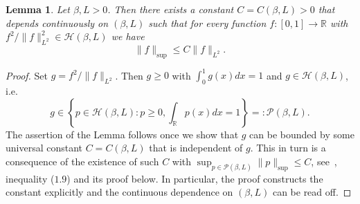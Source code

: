 \documentclass[10.5pt,letter]{article}
\numberwithin{equation}{section}
\newtheorem{lemma}[theorem]{Lemma}
\theoremstyle{definition}
\newcommand{\R}{\mathbb{R}}
\newcommand{\1}{\mathbbm{1}}
\begin{document}
\begin{lemma}\label{lemma:Hölder_density_sup_bounded}
    Let $\beta,L>0$. Then there exists a constant $C=C(\beta,L)>0$ that depends continuously on $(\beta,L)$ such that for every function $f:[0,1]\rightarrow\R$ with $f^2/\|f\|_{L^2}^2\in\mathcal{H}(\beta,L)$ we have
    \[ \|f\|_{\sup} \leq C\|f\|_{L^2}.\]
\end{lemma}
\begin{proof}
   Set $g=f^2/\|f\|_{L^2}$. Then $g\geq 0$ with $\int_0^1 g(x)dx =1$ and $g\in\mathcal{H}(\beta,L)$, i.e.
   \[ g\in\left\{p\in\mathcal{H}(\beta,L): p\geq 0, \int_\R p(x)dx=1\right\} =: \mathcal{P}(\beta,L).\]
   The assertion of the Lemma follows once we show that $g$ can be bounded by some universal constant $C=C(\beta,L)$ that is independent of $g$. This in turn is a consequence of the existence of such $C$ with $\sup_{p\in\mathcal{P}(\beta,L)}\|p\|_{\sup} \leq C$, see~\cite{Tsybakov}, inequality ($1.9$) and its proof below. In particular, the proof constructs the constant explicitly and the continuous dependence on $(\beta,L)$ can be read off.
\end{proof}
\end{document}
